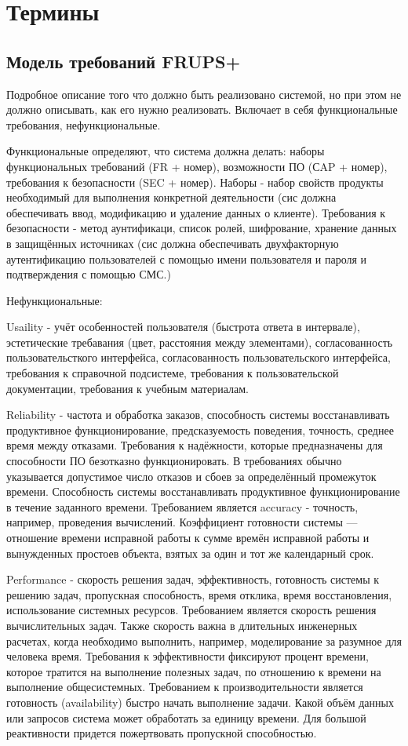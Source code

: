 
\section[Термины]{Термины}
\subsection[Модель требований FRUPS+]{Модель требований FRUPS+}
Подробное описание того что должно быть реализовано системой, но при этом не должно описывать, как его нужно реализовать.
Включает в себя функциональные требования, нефункциональные. 

Функциональные определяют, что система должна делать: наборы функциональных требований (FR + номер), возможности ПО (СAP + номер), требования к безопасности (SEC + номер).
Наборы - набор свойств продукты необходимый для выполнения конкретной деятельности (сис должна обеспечивать ввод, модификацию и удаление данных о клиенте).
Требования к безопасности - метод аунтификаци, список ролей, шифрование, хранение данных в защищённых источниках (сис должна обеспечивать двухфакторную аутентификацию пользователей с помощью имени пользователя и пароля и подтверждения с помощью СМС.)

Нефункциональные: 

Usaility - учёт особенностей пользователя (быстрота ответа в интервале), эстетические требавания (цвет, расстояния между элементами), согласованность пользовательсткого интерфейса, согласованность пользовательского интерфейса, требования к справочной подсистеме, требования к пользовательской документации, требования к учебным материалам.

Reliability - частота и обработка заказов, способность системы восстанавливать продуктивное функционирование, предсказуемость поведения, точность, среднее время между отказами. Требования к надёжности, которые предназначены для способности ПО безотказно функционировать. 
В требованиях обычно указывается допустимое число отказов и сбоев за определённый промежуток времени. Способность системы восстанавливать продуктивное функционирование в течение заданного времени.
Требованием является accuracy - точность, например, проведения вычислений. Коэффициент готовности системы — отношение времени исправной работы к сумме времён исправной работы и вынужденных простоев объекта, взятых за один и тот же календарный срок.

Performance - скорость решения задач, эффективность, готовность системы к решению задач, пропускная способность, время отклика, время восстановления, использование системных ресурсов.
Требованием является скорость решения вычислительных задач. Также скорость важна в длительных инженерных расчетах, когда необходимо выполнить, например, моделирование за разумное для человека время.
Требования к эффективности фиксируют процент времени, которое тратится на выполнение полезных задач, по отношению к времени на выполнение общесистемных.
Требованием к производительности является готовность (availability) быстро начать выполнение задачи.
Какой объём данных или запросов система может обработать за единицу времени.
Для большой реактивности придется пожертвовать пропускной способностью.


